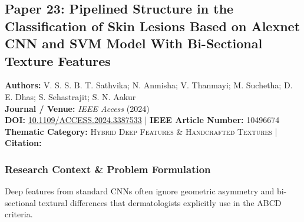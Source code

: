 \subsection{Paper 23: Pipelined Structure in the Classification of Skin Lesions Based on Alexnet CNN and SVM Model With Bi-Sectional Texture Features}
\label{sec:paper_23}

\begin{tcolorbox}[colback=gray!5!white,colframe=gray!75!black,title=\textbf{Metadata \& Citation Summary}]
\textbf{Authors:} V. S. S. B. T. Sathvika; N. Anmisha; V. Thanmayi; M. Suchetha; D. E. Dhas; S. Sehastrajit; S. N. Aakur \\
\textbf{Journal / Venue:} \textit{IEEE Access} (2024) \\
\textbf{DOI:} \href{https://doi.org/10.1109/ACCESS.2024.3387533}{10.1109/ACCESS.2024.3387533} \quad | \quad \textbf{IEEE Article Number:} 10496674 \\
\textbf{Thematic Category:} \textsc{Hybrid Deep Features \& Handcrafted Textures} \quad | \quad \textbf{Citation:} \cite{10496674}
\end{tcolorbox}

\subsubsection*{Research Context \& Problem Formulation}
Deep features from standard CNNs often ignore geometric asymmetry and bi-sectional textural differences that dermatologists explicitly use in the ABCD criteria.

